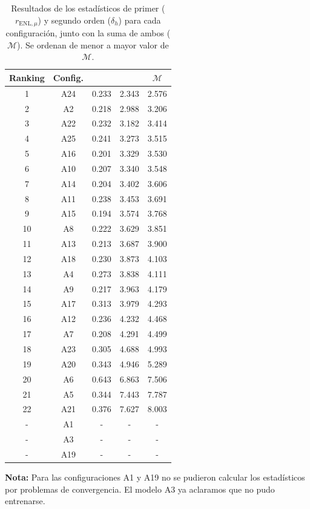 \begin{table}[htbp]
	\hspace{0.2cm}
	\centering
	\caption{Resultados de los estadísticos de primer ($r_{\text{ENL},\mu}$) y segundo orden ($\delta_h$) para cada configuración, junto con la suma de ambos ($\mathcal{M}$). Se ordenan de menor a mayor valor de $\mathcal{M}$.\newline}
	\label{tab:statistics_results}
	\small
	\begin{tabular}{|c|c|c|c|c|}
		\hline
		\textbf{Ranking} &
		\textbf{Config.} &
		\makecell{$r_{\text{ENL},\mu}$} &
		\makecell{$\delta_h$} &
		$\mathcal{M}$ \\
		\hline
		1 & A24 & 0.233 & 2.343 & 2.576 \\
		2 & A2 & 0.218 & 2.988 & 3.206 \\
		3 & A22 & 0.232 & 3.182 & 3.414 \\
		4 & A25 & 0.241	& 3.273	& 3.515 \\
		5 & A16 & 0.201 & 3.329 & 3.530 \\
		6 & A10 & 0.207 & 3.340 & 3.548 \\
		7 & A14 & 0.204 & 3.402 & 3.606 \\
		8 & A11 & 0.238 & 3.453 & 3.691 \\
		9 & A15 & 0.194 & 3.574 & 3.768 \\
		10 & A8 & 0.222 & 3.629 & 3.851 \\
		11 & A13 & 0.213 & 3.687 & 3.900 \\
		12 & A18 & 0.230 & 3.873 & 4.103 \\
		13 & A4 & 0.273 & 3.838 & 4.111 \\
		14 & A9 & 0.217 & 3.963 & 4.179 \\
		15 & A17 & 0.313 & 3.979 & 4.293 \\
		16 & A12 & 0.236 & 4.232 & 4.468 \\
		17 & A7 & 0.208 & 4.291 & 4.499 \\
		18 & A23 & 0.305 & 4.688 & 4.993 \\
		19 & A20 & 0.343 & 4.946 & 5.289 \\
		20 & A6 & 0.643 & 6.863 & 7.506 \\
		21 & A5 & 0.344 & 7.443 & 7.787 \\
		22 & A21 & 0.376 & 7.627 & 8.003 \\
		\hline
		- & A1 & - & - & - \\
		- & A3 & - & - & - \\
		- & A19 & - & - & - \\
		\hline
	\end{tabular}
	\vspace{0.5cm}
	\begin{flushleft}
		\footnotesize
		\textbf{Nota:}
		Para las configuraciones A1 y A19 no se pudieron calcular los estadísticos por problemas de convergencia. El modelo A3 ya aclaramos que no pudo entrenarse.
	\end{flushleft}
\end{table}

